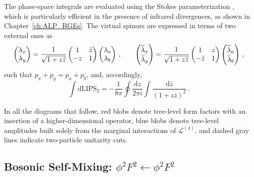The phase-space integrals are evaluated using the Stokes parameterization
\cite{Mastrolia:2009dr}, which is particularly efficient in the presence of infrared
divergences, as shown in Chapter~\ref{ch:ALP_RGEs}.
The virtual spinors are expressed in terms of two external ones as
\begin{equation}
    \begin{pmatrix} \lambda_x \\ \lambda_y \end{pmatrix}
     =
   \frac{1}{\sqrt{1+ z \bar{z}}}
   \begin{pmatrix} 1 & \bar{z} \\ -z & 1 \end{pmatrix}
   \begin{pmatrix} \lambda_{a} \\ \lambda_{b} \end{pmatrix}
    \,, \qquad
    \begin{pmatrix} \widetilde{\lambda}_x \\ \widetilde{\lambda}_y \end{pmatrix}
     =
   \frac{1}{\sqrt{1+ z \bar{z}}}
   \begin{pmatrix} 1 & z \\ -\bar z & 1 \end{pmatrix}
   \begin{pmatrix} \widetilde{\lambda}_{a} \\ \widetilde{\lambda}_{b} \end{pmatrix}\,,
   \label{eq:stokesparam}
\end{equation}
such that $p_x+p_y = p_a+p_b$, and, accordingly,
\begin{equation}
    \int \text{dLIPS}_2 = -\frac{1}{8 \pi} \oint \frac{\text{d}z}{2\pi i}
    \int \frac{\text{d}\bar{z}}{(1 + z \bar{z})^2}\,.
    \label{eq:dlips}
\end{equation}

In all the diagrams that follow, red blobs denote tree-level form factors with an
insertion of a higher-dimensional operator, blue blobs denote tree-level amplitudes
built solely from the marginal interactions of $\mathcal L^{(4)}$, and dashed gray lines
indicate two-particle unitarity cuts.

\subsection{\texorpdfstring{Bosonic Self-Mixing: $\phi^2 F^2 \leftarrow \phi^2 F^2$}{Bosonic Self-Mixing: phi2F2 from phi2F2}}
\label{sec:ex_phi2F2}

